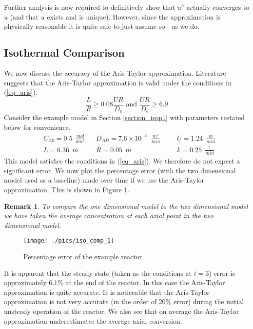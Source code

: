 \documentclass[11pt,fleqn]{article}
\theoremstyle{defstyle}
\newtheorem{rmrk}{Remark}[section]
\begin{document}
Further analysis is now required to definitively show that $u^h$ actually converges to $u$ (and that $u$ exists and is unique). However, since the approximation is physically reasonable it is quite safe to just assume so - as we do.

\subsection{Isothermal Comparison}
We now discuss the accuracy of the Aris-Taylor approximation. Literature \cite{washington} suggests that the Aris-Taylor approximation is valid under the conditions in (\ref{eq_aris}).
\begin{equation}
\frac{L}{R} \geq 0.08\frac{UR}{D_e} \text{ and } \frac{UR}{D_e} \geq 6.9
\label{eq_aris}
\end{equation}
Consider the example model in Section \ref{section_isop1} with parameters restated below for convenience.
\begin{equation*}
\begin{aligned}
&C_{A0} = 0.5~~ \frac{mol}{dm^3}
&&D_{AB} = 7.6\times 10^{-5} ~~\frac{m^2}{min}
&&&U = 1.24~~ \frac{m}{min} \\
&L = 6.36~~ m 
&&R = 0.05~~ m
&&&k = 0.25~~ \frac{1}{min} 
\end{aligned}
\end{equation*}
This model satisfies the conditions in (\ref{eq_aris}). We therefore do not expect a significant error. We now plot the percentage error (with the two dimensional model used as a baseline) made over time if we use the Aris-Taylor approximation. This is shown in Figure \ref{fig_isocomp1}.
\begin{rmrk}
To compare the one dimensional model to the two dimensional model we have taken the average concentration at each axial point in the two dimensional model.
\end{rmrk}
\begin{figure}[H] 
\centering
\texttt{[image: ./pics/iso\_comp\_1]}
\caption{Percentage error of the example reactor} 
\label{fig_isocomp1}
\end{figure}
It is apparent that the steady state (taken as the conditions at $t=3$) error is approximately 6.1\% at the end of the reactor. In this case the Aris-Taylor approximation is quite accurate. It is noticeable that the Aris-Taylor approximation is not very accurate (in the order of 20\% error) during the initial unsteady operation of the reactor. We also see that on average the Aris-Taylor approximation underestimates the average axial conversion. 
\end{document}
